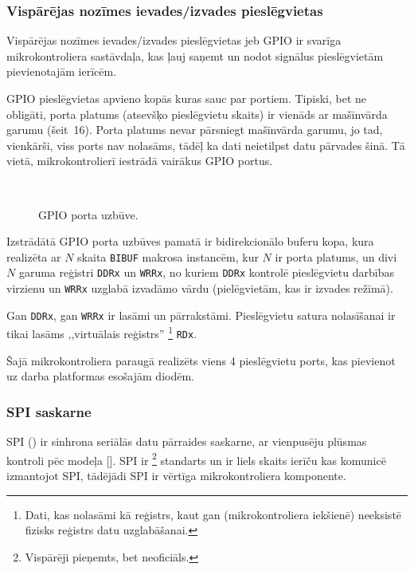 	\subsubsection{Vispārējas nozīmes ievades/izvades pieslēgvietas}
		Vispārējas nozīmes ievades/izvades pieslēgvietas jeb GPIO ir svarīga
		mikrokontroliera sastāvdaļa, kas ļauj saņemt un nodot signālus
		pieslēgvietām pievienotajām ierīcēm.
		
		GPIO pieslēgvietas apvieno kopās kuras sauc par portiem. Tipiski, bet
		ne obligāti, porta platums (atsevšķo pieslēgvietu skaits) ir vienāds
		ar mašīnvārda garumu (šeit~16). Porta platums nevar pārsniegt
		mašīnvārda garumu, jo tad, vienkārši, viss ports nav nolasāms, tādēļ ka dati
		neietilpst datu pārvades šinā. Tā vietā, mikrokontrolierī iestrādā
		vairākus GPIO portus.
		
		\begin{figure}[th]
			\centering
			\def\svgwidth{0.9\textwidth}
			{\ttfamily\footnotesize}\\
			\caption{GPIO porta uzbūve.}
			\label{fig:gpio}
		\end{figure}
		
		Izstrādātā GPIO porta uzbūves pamatā ir
		bidirekcionālo buferu kopa, kura realizēta ar $N$ skaita
		\texttt{BIBUF} makrosa instancēm, kur $N$ ir porta platums,
		un divi $N$ garuma reģistri \texttt{DDRx} un \texttt{WRRx},
		no kuriem \texttt{DDRx} kontrolē pieslēgvietu darbības virzienu un
		\texttt{WRRx} uzglabā izvadāmo vārdu (pielēgvietām, kas ir izvades režīmā).
		
		Gan \texttt{DDRx}, gan \texttt{WRRx} ir lasāmi un pārrakstāmi.
		Pieslēgvietu satura nolasīšanai ir tikai lasāms ,,virtuālais reģistrs''%
		\footnote{Dati, kas nolasāmi kā reģistrs, kaut gan (mikrokontroliera iekšienē)
			neeksistē fizisks reģistrs datu uzglabāšanai.}
		\texttt{RDx}.
	
	Šajā mikrokontroliera paraugā realizēts viens 4 pieslēgvietu ports, kas
	pievienot uz darba platformas esošajām diodēm.
	
	\clearpage %
	\subsubsection{SPI saskarne} \label{sec:spi}
		SPI () ir sinhrona seriālās
		datu pārraides saskarne, ar vienpusēju plūsmas kontroli pēc
		 modeļa [\todo{}]. SPI ir %
		\footnote{Vispārēji pieņemts, bet neoficiāls.}
		standarts un ir liels skaits ierīču kas komunicē izmantojot SPI,
		tādējādi SPI ir vērtīga mikrokontroliera komponente.
		
